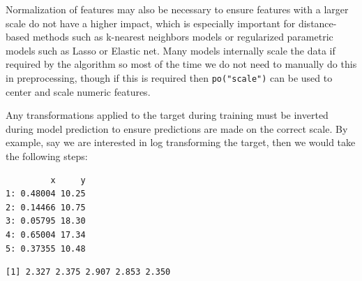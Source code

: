 Normalization of features may also be necessary to ensure features with
a larger scale do not have a higher impact, which is especially
important for distance-based methods such as k-nearest
neighbors models or regularized parametric
models such as Lasso or Elastic net. Many models internally scale the
data if required by the algorithm so most of the time we do not need to
manually do this in preprocessing, though if this is required then
\texttt{po("scale")} can be used to center and scale numeric features.

Any transformations applied to the target during training must be
inverted during model prediction to ensure predictions are made on the
correct scale. By example, say we are interested in log transforming the
target, then we would take the following steps:

\begin{Shaded}
\begin{Highlighting}[]
\OtherTok{=} \NormalTok{(} \NormalTok{(}\NormalTok{), } \NormalTok{(}\NormalTok{, }\NormalTok{, }\NormalTok{))}
\end{Highlighting}
\end{Shaded}

\begin{verbatim}
         x     y
1: 0.48004 10.25
2: 0.14466 10.75
3: 0.05795 18.30
4: 0.65004 17.34
5: 0.37355 10.48
\end{verbatim}

\begin{Shaded}
\begin{Highlighting}[]
\NormalTok{df[, y }\SpecialCharTok{:}\ErrorTok{=} \NormalTok{(y)]}
\SpecialCharTok{$}
\end{Highlighting}
\end{Shaded}

\begin{verbatim}
[1] 2.327 2.375 2.907 2.853 2.350
\end{verbatim}

\begin{Shaded}
\begin{Highlighting}[]
\OtherTok{=} \NormalTok{(}\SpecialCharTok{\textasciitilde{}}
\end{Highlighting}
\end{Shaded}

